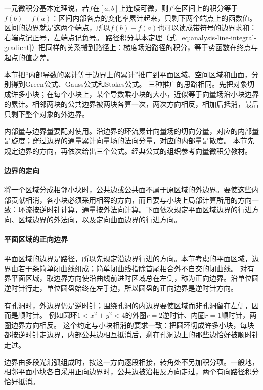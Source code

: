 一元微积分基本定理说，若$f$在$[a,b]$上连续可微，则$f'$在区间上的积分等于$f(b)-f(a)$：区间内部各点的变化率累计起来，只剩下两个端点上的函数值。
区间的边界就是这两个端点，所以$f(b)-f(a)$也可以读成带符号的边界求和：右端点记正号，左端点记负号。
路径积分基本定理（式~\eqref{eq:analysis-line-integral-gradient}）把同样的关系搬到路径上：梯度场沿路径的积分，等于势函数在终点与起点的值之差。

本节把“内部导数的累计等于边界上的累计”推广到平面区域、空间区域和曲面，分别得到Green公式、Gauss公式和Stokes公式。
三种推广的思路相同。先把对象切成许多小块；在每个小块上，某个导数乘小块的大小，近似等于向量场沿小块边界的累计。相邻两块的公共边界被两块各算一次，两次方向相反，相加后抵消，最后只剩下整个对象的外边界。

内部量与边界量要配对使用。沿边界的环流累计向量场的切向分量，对应的内部量是旋度；穿过边界的通量累计向量场的法向分量，对应的内部量是散度。
本节先规定边界的方向，再依次给出三个公式。经典公式的组织参考向量微积分教材。

\paragraph{边界的定向}

将一个区域分成相邻小块时，公共边或公共面不属于原区域的外边界。要使这些内部贡献相消，各小块必须采用相容的方向，而且要与小块上局部计算所用的方向一致：环流按逆时针计算，通量按外法向计算。下面依次规定平面区域边界的行进方向、区域边界的外法向，以及定向曲面边界的行进方向。

\paragraph{平面区域的正向边界}

平面区域的边界是路径，所以先规定沿边界行进的方向。本节考虑的平面区域，边界由若干条简单闭曲线组成；简单闭曲线指除首尾相合外不自交的闭曲线。
对有界平面区域，取边界方向使沿曲线前进时区域总在左侧，称为正向边界。沿单位圆逆时针行走，单位圆盘始终在左手边，所以圆盘的正向边界是逆时针方向。

有孔洞时，外边界仍是逆时针；围绕孔洞的内边界要使区域而非孔洞留在左侧，因而是顺时针。
例如圆环$1<x^2+y^2<4$的外圈$r=2$逆时针、内圈$r=1$顺时针，两圈边界方向相反。
这个约定与小块相消的要求一致：把圆环切成许多小块，每块都按逆时针走边界，内部公共边相互抵消后，剩在孔洞边上的那些边恰好被顺时针走过。

边界由多段光滑弧组成时，按这一方向逐段相接，转角处不另加积分项。一般地，相邻平面小块各自采用正向边界时，公共边被沿相反方向走过，两个有向路径积分恰好抵消。

